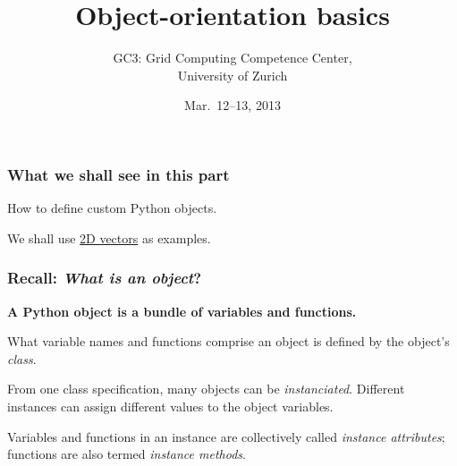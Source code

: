 \documentclass[english,serif,mathserif,xcolor=pdftex,dvipsnames,table]{beamer}
\title[OOP basics]{%
  Object-orientation basics
}
\author[GC3]{%
  GC3: Grid Computing Competence Center, \\
  University of Zurich
}
\date{Mar.~12--13, 2013}
\begin{document}
\maketitle


\begin{frame}
  \frametitle{What we shall see in this part}

  How to define custom Python objects.

  \+
  We shall use \href{http://jccc-mpg.wikidot.com/vectors}{2D
    vectors} as examples.
\end{frame}


\begin{frame}
  \frametitle{Recall: \emph{What is an object}?}
  \textbf{A Python object is a bundle of variables and functions.}

  \+
  What variable names and functions comprise an object is defined
  by the object's \emph{class}.

  \+
  From one class specification, many objects can be
  \emph{instanciated}.  Different instances can assign different
  values to the object variables.

  \+
  Variables and functions in an instance are collectively called
  \emph{instance attributes}; functions are also termed \emph{instance
    methods}.
\end{frame}
\end{document}
